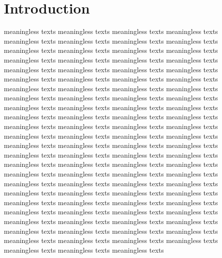 \documentclass[12pt, twoside, notitlepage, twocolumn]{article}
\newcommand{\makeabs}
{
    \textbf{Abstract:}
    A set of selected data samples which were collected by LHCb\cite{LHCb} in 2011 are studied.
    Contained $B^{\pm}\rightarrow\pi^{\pm}\pi^{+}\pi^{-}$ decays in magnet ``up'' and ``down'' 
    polarity are constructed.Global $CP$ asymmetry in this channal is measured to be 
    $A_{CP}=0.135\pm0.023\pm0.010$,
    in which the first and second uncertainties are statistical and systematical respectively.
    \newline\hbox{}
}
\newcommand{\makeauth}
{
    Qichen Dong, Harriet Watson\newline
    School of Physics and Astronomy, 
    University of Manchester, Manchester, M13 9PL.
}
\newcommand{\maketit} 
{
    \textbf{Measurement of $\bm{CP}$ Violation in $\bm{B^{\pm}\rightarrow\pi^{\pm}\pi^{+}\pi^{-}}$ 
    Decay Channal at Large Hadron Collider}
}
\begin{document}
    \twocolumn[\begin{@twocolumnfalse}
        \begin{flushleft}
            \maketit
            \makeauth
        \end{flushleft}
        \makeabs
    \end{@twocolumnfalse}]

    \section{Introduction}
    meaningless texts meaningless texts meaningless texts meaningless texts meaningless texts 
    meaningless texts meaningless texts meaningless texts meaningless texts meaningless texts 
    meaningless texts meaningless texts meaningless texts meaningless texts meaningless texts 
    meaningless texts meaningless texts meaningless texts meaningless texts meaningless texts 
    meaningless texts meaningless texts meaningless texts meaningless texts meaningless texts 
    meaningless texts meaningless texts meaningless texts meaningless texts meaningless texts 
    meaningless texts meaningless texts meaningless texts meaningless texts meaningless texts 
    meaningless texts meaningless texts meaningless texts meaningless texts meaningless texts 
    meaningless texts meaningless texts meaningless texts meaningless texts meaningless texts 
    meaningless texts meaningless texts meaningless texts meaningless texts meaningless texts 
    meaningless texts meaningless texts meaningless texts meaningless texts meaningless texts 
    meaningless texts meaningless texts meaningless texts meaningless texts meaningless texts 
    meaningless texts meaningless texts meaningless texts meaningless texts meaningless texts 
    meaningless texts meaningless texts meaningless texts meaningless texts meaningless texts 
    meaningless texts meaningless texts meaningless texts meaningless texts meaningless texts 
    meaningless texts meaningless texts meaningless texts meaningless texts meaningless texts 
    meaningless texts meaningless texts meaningless texts meaningless texts meaningless texts 
    meaningless texts meaningless texts meaningless texts meaningless texts meaningless texts 
    meaningless texts meaningless texts meaningless texts meaningless texts meaningless texts 
\end{document}

